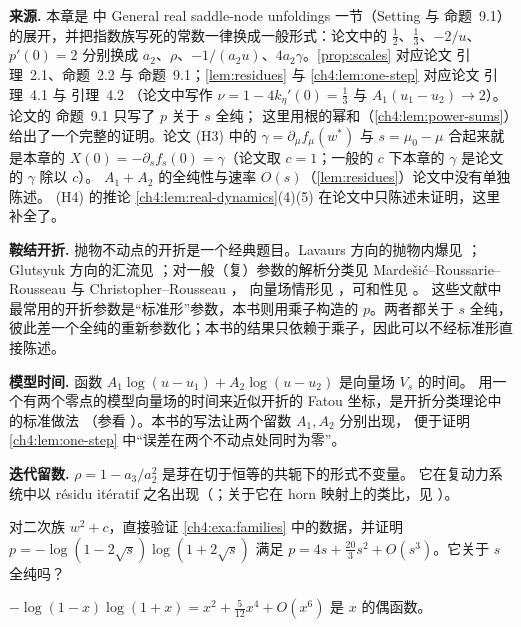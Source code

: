 \notes

\textbf{来源.} 本章是 \cite{KneserPaper} 中 General real saddle-node unfoldings 一节（Setting 与 命题~9.1）
的展开，并把指数族写死的常数一律换成一般形式：论文中的 $\frac12$、$\frac13$、$-2/u$、$p'(0)=2$
分别换成 $a_2$、$\rho$、$-1/(a_2u)$、$4a_2\gamma$。\cref{prop:scales} 对应论文 引理~2.1、命题~2.2
与 命题~9.1；\cref{lem:residues} 与 \cref{ch4:lem:one-step} 对应论文 引理~4.1 与 引理~4.2
（论文中写作 $\nu=1-4k_\eta'(0)=\frac13$ 与 $A_1(u_1-u_2)\to2$）。论文的 命题~9.1 只写了 $p$ 关于 $s$ 全纯；
这里用根的幂和（\cref{ch4:lem:power-sums}）给出了一个完整的证明。论文 (H3) 中的 $\gamma=\partial_\mu f_\mu(w^*)$
与 $s=\mu_0-\mu$ 合起来就是本章的 $X(0)=-\partial_sf_s(0)=\gamma$（论文取 $c=1$；一般的 $c$ 下本章的 $\gamma$ 是论文的 $\gamma$ 除以 $c$）。
$A_1+A_2$ 的全纯性与速率 $O(s)$（\cref{lem:residues}）论文中没有单独陈述。
(H4) 的推论 \cref{ch4:lem:real-dynamics}(4)(5) 在论文中只陈述未证明，这里补全了。

\textbf{鞍结开折.} 抛物不动点的开折是一个经典题目。Lavaurs 方向的抛物内爆见 \cite{Lavaurs1989,Shishikura2000,Oudkerk1999}；
Glutsyuk 方向的汇流见 \cite{Glutsyuk2001}；对一般（复）参数的解析分类见
Marde\v{s}i\'c--Roussarie--Rousseau \cite{MRR2004} 与 Christopher--Rousseau \cite{ChristopherRousseau}，
向量场情形见 \cite{RousseauTeyssier2008}，可和性见 \cite{Ribon2010}。
这些文献中最常用的开折参数是``标准形''参数，本书则用乘子构造的 $p$。两者都关于 $s$ 全纯，
彼此差一个全纯的重新参数化；本书的结果只依赖于乘子，因此可以不经标准形直接陈述。

\textbf{模型时间.} 函数 $A_1\log(u-u_1)+A_2\log(u-u_2)$ 是向量场 $V_s$ 的时间。
用一个有两个零点的模型向量场的时间来近似开折的 Fatou 坐标，是开折分类理论中的标准做法
（参看 \cite{MRR2004}）。本书的写法让两个留数 $A_1,A_2$ 分别出现，
便于证明 \cref{ch4:lem:one-step} 中``误差在两个不动点处同时为零''。

\textbf{迭代留数.} $\rho=1-a_3/a_2^2$ 是芽在切于恒等的共轭下的形式不变量。
它在复动力系统中以 résidu itératif 之名出现（\cite{Milnor2006}；关于它在 horn 映射上的类比，见 \cite{BuffEpstein2002}）。

\exercises

\begin{exercise}\label{ch4:ex:quad}
对二次族 $w^2+c$，直接验证 \cref{ch4:exa:families} 中的数据，并证明 $p=-\log(1-2\sqrt s)\log(1+2\sqrt s)$
满足 $p=4s+\frac{20}3s^2+O(s^3)$。它关于 $s$ 全纯吗？
\end{exercise}
\begin{hint}
$-\log(1-x)\log(1+x)=x^2+\frac5{12}x^4+O(x^6)$ 是 $x$ 的偶函数。
\end{hint}

